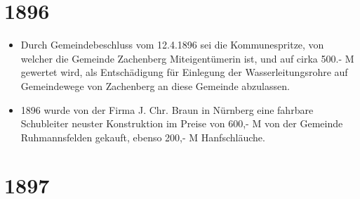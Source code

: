 \documentclass[12pt,a4paper]{book}
\begin{document}
\section*{1896}

\begin{itemize}
\item Durch Gemeindebeschluss vom 12.4.1896 sei die Kommunespritze, von welcher
die Gemeinde Zachenberg Miteigentümerin ist, und auf cirka 500.- M gewertet
wird, als Entschädigung für Einlegung der Wasserleitungsrohre auf Gemeindewege
von Zachenberg an diese Gemeinde abzulassen.

\item 1896 wurde von der Firma J. Chr. Braun in Nürnberg eine fahrbare
Schubleiter neuster Konstruktion im Preise von 600,- M von der Gemeinde
Ruhmannsfelden gekauft, ebenso 200,- M Hanfschläuche.
\end{itemize}

\section*{1897}
\end{document}
